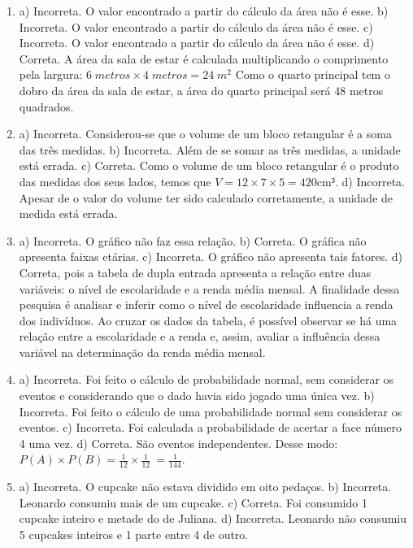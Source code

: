 \begin{enumerate}
\item a) Incorreta. O valor encontrado a partir do cálculo da área não é esse.
b) Incorreta. O valor encontrado a partir do cálculo da área não é esse.
c) Incorreta. O valor encontrado a partir do cálculo da área não é
esse.
d) Correta. A área da sala de estar é calculada multiplicando o comprimento pela largura:
${6 \; metros} \times {4\; metros} = 24\;m^2$ Como o quarto principal
tem o dobro da área da sala de estar, a área do quarto principal será 48 metros quadrados.

\item a) Incorreta. Considerou-se que o volume de um bloco retangular é a soma das três medidas.
b) Incorreta. Além de se somar as três medidas, a unidade está errada.
c) Correta. Como o volume de um bloco retangular é o produto das medidas dos seus lados, temos que
$V = 12 \times 7 \times 5 = 420\text{cm}³$.
d) Incorreta. Apesar de o valor do volume ter sido calculado corretamente, a unidade de medida está errada.

\item a) Incorreta. O gráfico não faz essa relação.
b) Correta. O gráfica não apresenta faixas etárias.
c) Incorreta. O gráfico não apresenta tais fatores.
d) Correta, pois a tabela de dupla entrada apresenta a relação entre duas variáveis: o nível de escolaridade e a renda média mensal. A finalidade dessa pesquisa é analisar e inferir como o nível de escolaridade influencia a renda dos indivíduos. Ao cruzar os dados da
tabela, é possível observar se há uma relação entre a escolaridade e a renda e, assim, avaliar a influência dessa variável na determinação da renda média mensal.

\item a) Incorreta. Foi feito o cálculo de probabilidade normal, sem considerar os eventos e considerando que o dado havia sido jogado uma
única vez.
b) Incorreta. Foi feito o cálculo de uma probabilidade normal sem considerar os eventos.
c) Incorreta. Foi calculada a probabilidade de acertar a face número 4 uma vez.
d) Correta. São eventos independentes. Desse modo:
$P\left( A \right) \times P\left( B \right) = \frac{1}{12} \times \frac{1}{12}\  = \frac{1}{144}$.

\item a) Incorreta. O cupcake não estava dividido em oito pedaços.
b) Incorreta. Leonardo consumiu mais de um cupcake.
c) Correta. Foi consumido 1 cupcake inteiro e metade do de Juliana.
d) Incorreta. Leonardo não consumiu 5 cupcakes inteiros e 1 parte entre 4 de outro.
\end{enumerate}

